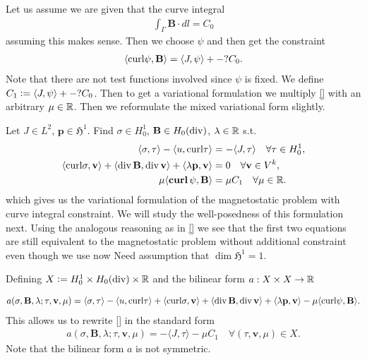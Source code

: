 \documentclass[../master_thesis.tex]{subfiles}
\begin{document}
Let us assume we are given that the curve integral 
\begin{align*}
    \int_\Gamma \mathbf{B} \cdot dl = C_0
\end{align*}
assuming this makes sense. Then we choose $\psi$ and then get 
the constraint
\begin{align*}
    \langle \mathbf{\operatorname{curl}} \psi, \mathbf{B} \rangle = \langle J, \psi \rangle +-? C_0.
\end{align*}
Note that there are not test functions involved since $\psi$ is fixed. 
We define $C_1 \vcentcolon=  \langle J, \psi \rangle +-? C_0$. Then to get a variational 
formulation we multiply \ref{} with an arbitrary $\mu \in \mathbb{R}$. Then we reformulate 
the mixed variational form slightly. 

Let $J \in L^2$, $\mathbf{p} \in \mathfrak{H}^1$. 
Find $\sigma \in H^1_0$, $\mathbf{B} \in H_0(\operatorname{div})$, $\lambda \in \mathbb{R}$ s.t.
\begin{align}
    \langle \sigma, \tau \rangle - \langle u, \mathbf{\curl}\tau \rangle 
    &=  -\langle J, \tau \rangle \quad \forall \tau \in H^1_0, \label{eq:first_eq_mixed_formulation_curve_integral}
    \\ \langle \mathbf{\curl}\sigma, \mathbf{v} \rangle + \langle \diver \mathbf{B}, \diver \mathbf{v} \rangle 
    + \langle \lambda \mathbf{p}, \mathbf{v} \rangle 
    &= 0 \quad \forall \mathbf{v} \in V^k, \label{eq:second_eq_mixed_formulation_curve_integral}
    \\ \mu \langle \bm{\curl} \psi, \mathbf{B} \rangle &= \mu C_1 \quad \forall \mu \in \real.
\end{align}
which gives us the variational formulation of the magnetostatic problem with curve integral 
constraint. We will study the well-posedness of this formulation next. 
Using the analogous reasoning as in \ref{} we see that the first two equations are still equivalent 
to the magnetostatic problem without additional constraint even though we use now {\color{red} Need 
assumption that $\dim \mathfrak{H}^1= 1$}. 

Defining $X \vcentcolon= H^1_0 \times H_0(\operatorname{div}) \times \mathbb{R}$ and the 
bilinear form $a:X\times X \rightarrow \mathbb{R}$

\begin{align*}
    a(\sigma,\mathbf{B}, \lambda;\tau,\mathbf{v},\mu) 
    =   \langle \sigma, \tau \rangle - \langle u, \mathbf{\operatorname{curl}}\tau \rangle
        + \langle \mathbf{\operatorname{curl}}\sigma, \mathbf{v} \rangle + \langle \operatorname{div} \mathbf{B}, \operatorname{div} \mathbf{v} \rangle 
        + \langle \lambda \mathbf{p}, \mathbf{v} \rangle - \mu \langle \mathbf{\operatorname{curl}} \psi, \mathbf{B} \rangle.
\end{align*}
This allows us to rewrite \ref{} in the standard form
\begin{align*}
    a(\sigma,\mathbf{B},\lambda;\tau,\mathbf{v},\mu) = -\langle J, \tau \rangle - \mu C_1
        \quad \forall (\tau,\mathbf{v},\mu) \in X.
\end{align*}
Note that the bilinear form $a$ is not symmetric. 
\end{document}
